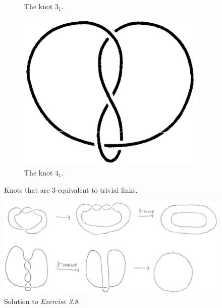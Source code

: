\documentclass[titlepage]{article}
\numberwithin{figure}{section}
\numberwithin{table}{section}
\numberwithin{equation}{section}
\begin{document}
\begin{itemize}
\begin{figure}[h!]
\begin{subfigure}[b]{0.3\linewidth}
            \caption{The knot $3_1$.}
            \label{fig:ex3-8a}
        \end{subfigure}
        \begin{subfigure}[b]{0.3\linewidth}
            \centering
            \includegraphics[width=0.55\linewidth]{Blender/ex3-8b.png}
            \caption{The knot $4_1$.}
            \label{fig:ex3-8b}
        \end{subfigure}
        \caption{Knots that are 3-equivalent to trivial links.}
        \label{fig:ex3-8}
    \end{figure}
    \begin{figure}[h!]
        \centering
        \includegraphics[width=0.7\linewidth]{Blender/ex3-8-2.png}
        \caption{Solution to \emph{Exercise 3.8}.}
        \label{fig:ex3-8-2}
    \end{figure}
\end{itemize}
\end{document}
